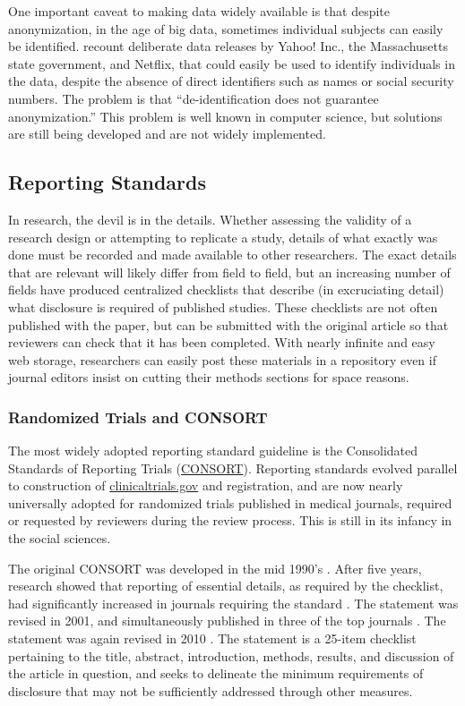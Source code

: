 \documentclass[12pt] {article}
\begin{document}
One important caveat to making data widely available is that despite
anonymization, in the age of big data, sometimes individual subjects can
easily be identified. \cite{heffetz_privacy_2014} recount deliberate data
releases by Yahoo! Inc., the Massachusetts state government, and
Netflix, that could easily be used to identify individuals in the data,
despite the absence of direct identifiers such as names or social
security numbers. The problem is that ``de-identification does not
guarantee anonymization.'' This problem is well known in computer science, but solutions are still being developed and are not widely implemented.


\subsection{Reporting Standards}\label{reporting-standards}
In research, the devil is in the details. Whether assessing the validity of a research design or attempting to replicate a study, details of what exactly was done must be recorded and made available to other researchers. The exact details that are relevant will likely differ from field to field, but an increasing number of fields have
produced centralized checklists that describe (in excruciating detail) what disclosure is required of published studies. These checklists are not often published with the paper, but can be submitted with the original article so that reviewers can check that it has been completed. With nearly infinite and easy web storage, researchers can easily post these materials in a repository even if journal editors insist on cutting their methods sections for space reasons. 

\subsubsection{Randomized Trials and CONSORT}\label{randomized-trials}
The most widely adopted reporting standard guideline is the Consolidated Standards of Reporting Trials (\href{http://www.consort-statement.org}{CONSORT}). Reporting standards evolved parallel to construction of \href{http://clinicaltrials.gov}{clinicaltrials.gov} and registration, and are now nearly universally adopted for randomized trials published in medical journals, required or requested by reviewers during the review process. This is still in its infancy in the social sciences.

The original CONSORT  was developed in the mid 1990's \citep{begg_c_improving_1996}. After five years, research showed that reporting of essential details, as required by the checklist, had significantly increased in journals requiring the standard  \citep{moher_d_use_2001}. The statement was revised in 2001, and simultaneously published in three of the top journals \citep{moher_consort_2001}. The statement was again revised in 2010 \citep{schulz_consort_2010}. The statement is a 25-item checklist pertaining to the title, abstract, introduction, methods, results, and discussion of the article in question, and seeks to delineate the minimum requirements of disclosure that may not be sufficiently addressed through other measures.
\end{document}
